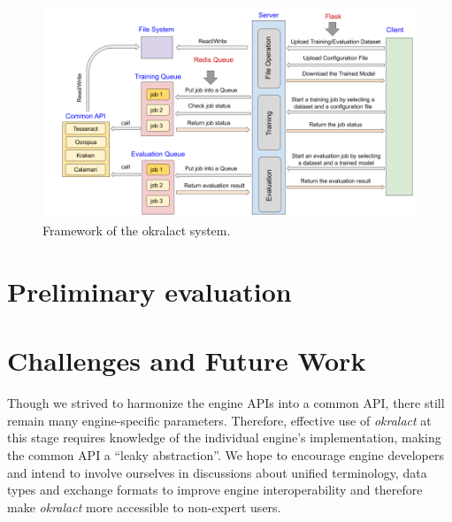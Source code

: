 \documentclass[conference]{IEEEtran}
\begin{document}
\begin{figure}[ht!]
        \begin{center}
     \includegraphics[width=0.8\linewidth]{Figures/Framework.png}
        \end{center}
        \caption{\small{Framework of the okralact system.}}
\label{fig:framework}
\end{figure}

\section{Preliminary evaluation}



\section*{Challenges and Future Work}



Though we strived to harmonize the engine APIs into a common API,
there still remain many engine-specific parameters. Therefore,
effective use of \textit{okralact} at this stage requires knowledge
of the individual engine's implementation, making the common API a
``leaky abstraction''. We hope to encourage engine developers and
intend to involve ourselves in discussions about unified
terminology, data types and exchange formats to improve engine
interoperability and therefore make \textit{okralact} more
accessible to non-expert users.
\end{document}
